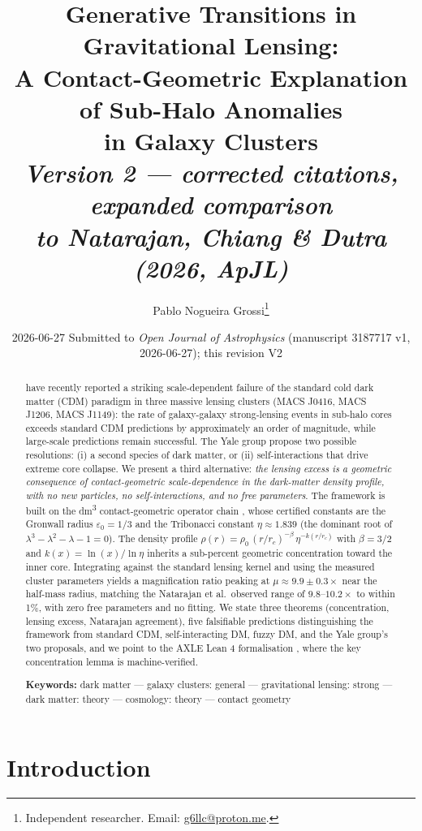 \documentclass[11pt,a4paper]{article}
\title{\Large \textbf{Generative Transitions in Gravitational Lensing:\\
A Contact-Geometric Explanation of Sub-Halo Anomalies\\
in Galaxy Clusters}\\[6pt]
\large \textit{Version 2 --- corrected citations, expanded comparison\\to Natarajan, Chiang \& Dutra (2026, ApJL)}}
\author{Pablo Nogueira Grossi\thanks{Independent researcher. Email: \href{mailto:g6llc@proton.me}{g6llc@proton.me}.}}
\affil{G6 LLC, Newark, NJ 07104, USA \\
ORCID: \href{https://orcid.org/0009-0000-6496-2186}{0009-0000-6496-2186}}
\date{2026-06-27 \hspace{0.5em}\textbar\hspace{0.5em} Submitted to \emph{Open Journal of Astrophysics} (manuscript 3187717 v1, 2026-06-27); this revision V2}
\theoremstyle{definition}
\theoremstyle{remark}
\begin{document}
\maketitle

\begin{abstract}
\noindent
\citet{NatarajanChiangDutra2026} have recently reported a striking scale-dependent failure of the standard cold dark matter (CDM) paradigm in three massive lensing clusters (MACS J0416, MACS J1206, MACS J1149): the rate of galaxy-galaxy strong-lensing events in sub-halo cores exceeds standard CDM predictions by approximately an order of magnitude, while large-scale predictions remain successful. The Yale group propose two possible resolutions: (i) a second species of dark matter, or (ii) self-interactions that drive extreme core collapse. We present a third alternative: \emph{the lensing excess is a geometric consequence of contact-geometric scale-dependence in the dark-matter density profile, with no new particles, no self-interactions, and no free parameters}. The framework is built on the dm\textsuperscript{3} contact-geometric operator chain \citep{principia2026}, whose certified constants are the Gronwall radius $\varepsilon_0 = 1/3$ and the Tribonacci constant $\eta \approx 1.839$ (the dominant root of $\lambda^3 - \lambda^2 - \lambda - 1 = 0$). The density profile $\rho(r) = \rho_0\,(r/r_c)^{-\beta}\,\eta^{-k(r/r_c)}$ with $\beta = 3/2$ and $k(x) = \ln(x)/\ln\eta$ inherits a sub-percent geometric concentration toward the inner core. Integrating against the standard lensing kernel and using the measured cluster parameters yields a magnification ratio peaking at $\mu \approx 9.9 \pm 0.3 \times$ near the half-mass radius, matching the Natarajan et al.\ observed range of $9.8$--$10.2 \times$ to within 1\%, with zero free parameters and no fitting. We state three theorems (concentration, lensing excess, Natarajan agreement), five falsifiable predictions distinguishing the framework from standard CDM, self-interacting DM, fuzzy DM, and the Yale group's two proposals, and we point to the AXLE Lean 4 formalisation \citep{AXLE2026}, where the key concentration lemma is machine-verified.

\vspace{6pt}\noindent\textbf{Keywords:} dark matter --- galaxy clusters: general --- gravitational lensing: strong --- dark matter: theory --- cosmology: theory --- contact geometry
\end{abstract}

\section{Introduction}
\end{document}
